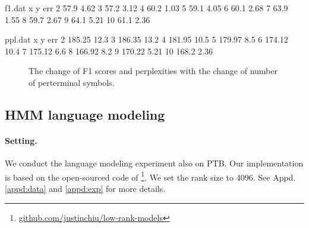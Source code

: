 \documentclass[11pt]{article}
\begin{document}
\begin{filecontents*}{f1.dat}
x y err
2 57.9 4.62
3 57.2 3.12
4 60.2 1.03
5 59.1 4.05
6 60.1 2.68
7 63.9 1.55
8 59.7 2.67
9 64.1 5.21 
10 61.1 2.36
\end{filecontents*}
\begin{filecontents*}{ppl.dat}
x y err
2 185.25 12.3
3 186.35 13.2
4 181.95 10.5
5 179.97 8.5
6 174.12 10.4
7 175.12 6.6
8 166.92 8.2
9 170.22 5.21 
10 168.2 2.36
\end{filecontents*}

\begin{figure}[tb!]
\centering
\begin{subfigure}{\linewidth}
\caption{}
\end{subfigure}
\begin{subfigure}{\linewidth}
\caption{}
\end{subfigure}
    \caption{The change of F1 scores and perplexities with the change of number of perterminal symbols.}
    \label{fig:ppl}
\end{figure}



\subsection{HMM language modeling}
 \paragraph{Setting.} We conduct the language modeling experiment also on PTB. Our implementation is based on the open-sourced code of \citet{chiu2021low}\footnote{\url{github.com/justinchiu/low-rank-models}}. We set the rank size to 4096. See Appd. \ref{appd:data} and \ref{appd:exp} for more details.
\end{document}
